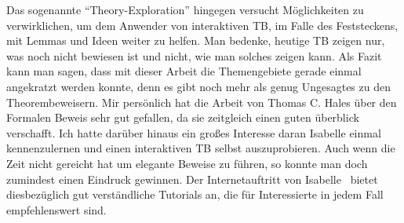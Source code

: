 Das sogenannte \enquote{Theory-Exploration} hingegen versucht Möglichkeiten zu verwirklichen, um dem Anwender von interaktiven TB, im Falle des Feststeckens, mit Lemmas und Ideen weiter zu helfen.
Man bedenke, heutige TB zeigen nur, was noch nicht bewiesen ist und nicht, wie man solches zeigen kann.
Als Fazit kann man sagen, dass mit dieser Arbeit die Themengebiete gerade einmal angekratzt werden konnte, denn es gibt noch mehr als genug Ungesagtes zu den Theorembeweisern.
Mir persönlich hat die Arbeit von Thomas C. Hales über den Formalen Beweis sehr gut gefallen, da sie zeitgleich einen guten überblick verschafft.
Ich hatte darüber hinaus ein großes Interesse daran Isabelle einmal kennenzulernen und einen interaktiven TB selbst auszuprobieren.
Auch wenn die Zeit nicht gereicht hat um elegante Beweise zu führen, so konnte man doch zumindest einen Eindruck gewinnen.
Der Internetauftritt von Isabelle~\cite{isabellewebpage} bietet diesbezüglich gut verständliche Tutorials an, die für Interessierte in jedem Fall empfehlenswert sind.
